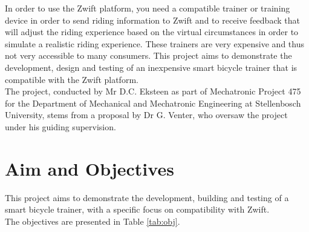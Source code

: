 
In order to use the Zwift platform, you need a compatible trainer or training device in order to send riding information to Zwift and to receive feedback that will adjust the riding experience based on the virtual circumstances in order to simulate a realistic riding experience. These trainers are very expensive and thus not very accessible to many consumers. This project aims to demonstrate the development, design and testing of an inexpensive smart bicycle trainer that is compatible with the Zwift platform.\\

The project, conducted by Mr D.C. Eksteen as part of Mechatronic Project 475 for the Department of Mechanical and Mechatronic Engineering at Stellenbosch University, stems from a proposal by Dr G. Venter, who oversaw the project under his guiding supervision.

\newpage

\section{Aim and Objectives}

This project aims to demonstrate the development, building and testing of a smart bicycle trainer, with a specific focus on compatibility with Zwift.\\
The objectives are presented in Table \ref{tab:obj}.

